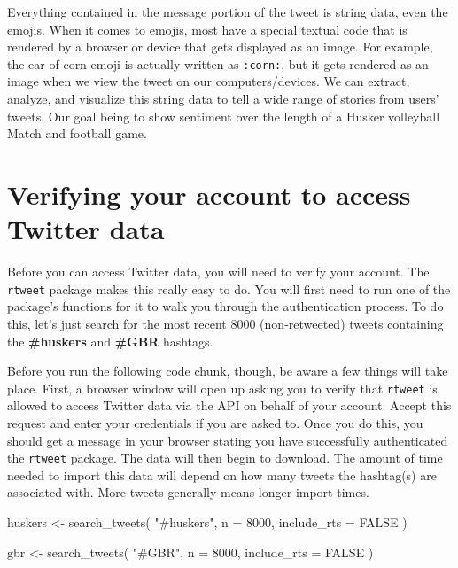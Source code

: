 \documentclass[
]{book}
\newenvironment{Shaded}{\begin{snugshade}}{\end{snugshade}}
\newcommand{\AttributeTok}[1]{\textcolor[rgb]{0.77,0.63,0.00}{#1}}
\newcommand{\ConstantTok}[1]{\textcolor[rgb]{0.00,0.00,0.00}{#1}}
\newcommand{\DecValTok}[1]{\textcolor[rgb]{0.00,0.00,0.81}{#1}}
\newcommand{\FunctionTok}[1]{\textcolor[rgb]{0.00,0.00,0.00}{#1}}
\newcommand{\NormalTok}[1]{#1}
\newcommand{\OtherTok}[1]{\textcolor[rgb]{0.56,0.35,0.01}{#1}}
\newcommand{\StringTok}[1]{\textcolor[rgb]{0.31,0.60,0.02}{#1}}
\begin{document}
Everything contained in the message portion of the tweet is string data, even the emojis. When it comes to emojis, most have a special textual code that is rendered by a browser or device that gets displayed as an image. For example, the ear of corn emoji is actually written as \texttt{:corn:}, but it gets rendered as an image when we view the tweet on our computers/devices. We can extract, analyze, and visualize this string data to tell a wide range of stories from users' tweets. Our goal being to show sentiment over the length of a Husker volleyball Match and football game.

\hypertarget{verifying-your-account-to-access-twitter-data}{%
\section{Verifying your account to access Twitter data}\label{verifying-your-account-to-access-twitter-data}}

Before you can access Twitter data, you will need to verify your account. The \texttt{rtweet} package makes this really easy to do. You will first need to run one of the package's functions for it to walk you through the authentication process. To do this, let's just search for the most recent 8000 (non-retweeted) tweets containing the \textbf{\#huskers} and \textbf{\#GBR} hashtags.

Before you run the following code chunk, though, be aware a few things will take place. First, a browser window will open up asking you to verify that \texttt{rtweet} is allowed to access Twitter data via the API on behalf of your account. Accept this request and enter your credentials if you are asked to. Once you do this, you should get a message in your browser stating you have successfully authenticated the \texttt{rtweet} package. The data will then begin to download. The amount of time needed to import this data will depend on how many tweets the hashtag(s) are associated with. More tweets generally means longer import times.

\begin{Shaded}
\begin{Highlighting}[]
\NormalTok{huskers }\OtherTok{\textless{}{-}} \FunctionTok{search\_tweets}\NormalTok{(}
  \StringTok{"\#huskers"}\NormalTok{, }\AttributeTok{n =} \DecValTok{8000}\NormalTok{, }\AttributeTok{include\_rts =} \ConstantTok{FALSE}
\NormalTok{)}

\NormalTok{gbr }\OtherTok{\textless{}{-}} \FunctionTok{search\_tweets}\NormalTok{(}
  \StringTok{"\#GBR"}\NormalTok{, }\AttributeTok{n =} \DecValTok{8000}\NormalTok{, }\AttributeTok{include\_rts =} \ConstantTok{FALSE}
\NormalTok{)}
\end{Highlighting}
\end{Shaded}
\end{document}
